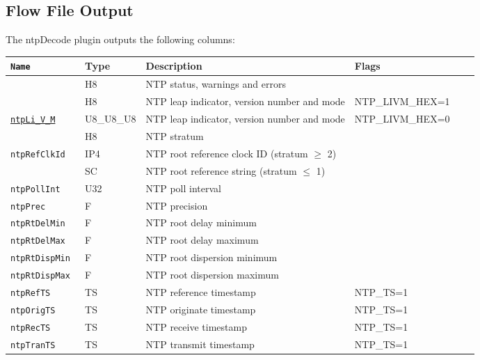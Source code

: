 \documentclass[documentation]{subfiles}
\begin{document}
\subsection{Flow File Output}
The ntpDecode plugin outputs the following columns:
\begin{longtable}{>{\tt}llll>{\tt\small}ll}
    \toprule
    {\bf Name}                      & {\bf Type} & {\bf Description}                              & {\bf Flags}\\
    \midrule\endhead%
    \nameref{ntpStat}               & H8         & NTP status, warnings and errors                & \\
    \nameref{ntpLiVM}               & H8         & NTP leap indicator, version number and mode    & NTP\_LIVM\_HEX=1\\
    \hyperref[ntpLiVM]{ntpLi\_V\_M} & U8\_U8\_U8 & NTP leap indicator, version number and mode    & NTP\_LIVM\_HEX=0\\
    \nameref{ntpStrat}              & H8         & NTP stratum                                    & \\
    ntpRefClkId                     & IP4        & NTP root reference clock ID (stratum $\geq$ 2) & \\
    \nameref{ntpRefStrId}           & SC         & NTP root reference string (stratum $\leq$ 1)   & \\
    ntpPollInt                      & U32        & NTP poll interval                              & \\
    ntpPrec                         & F          & NTP precision                                  & \\
    ntpRtDelMin                     & F          & NTP root delay minimum                         & \\
    ntpRtDelMax                     & F          & NTP root delay maximum                         & \\
    ntpRtDispMin                    & F          & NTP root dispersion minimum                    & \\
    ntpRtDispMax                    & F          & NTP root dispersion maximum                    & \\
    ntpRefTS                        & TS         & NTP reference timestamp                        & NTP\_TS=1\\
    ntpOrigTS                       & TS         & NTP originate timestamp                        & NTP\_TS=1\\
    ntpRecTS                        & TS         & NTP receive timestamp                          & NTP\_TS=1\\
    ntpTranTS                       & TS         & NTP transmit timestamp                         & NTP\_TS=1\\
    \bottomrule
\end{longtable}
\end{document}
